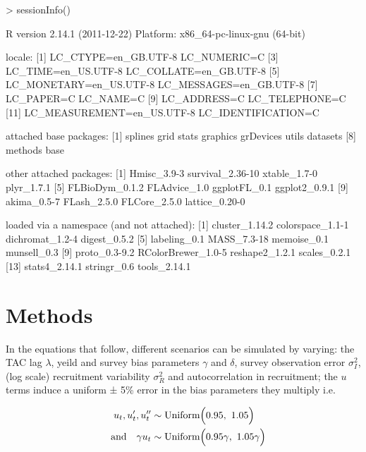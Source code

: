 \documentclass[a4paper]{article}
\begin{document}
\begin{Schunk}
\begin{Sinput}
> sessionInfo()
\end{Sinput}
\begin{Soutput}
R version 2.14.1 (2011-12-22)
Platform: x86_64-pc-linux-gnu (64-bit)

locale:
 [1] LC_CTYPE=en_GB.UTF-8       LC_NUMERIC=C              
 [3] LC_TIME=en_US.UTF-8        LC_COLLATE=en_GB.UTF-8    
 [5] LC_MONETARY=en_US.UTF-8    LC_MESSAGES=en_GB.UTF-8   
 [7] LC_PAPER=C                 LC_NAME=C                 
 [9] LC_ADDRESS=C               LC_TELEPHONE=C            
[11] LC_MEASUREMENT=en_US.UTF-8 LC_IDENTIFICATION=C       

attached base packages:
[1] splines   grid      stats     graphics  grDevices utils     datasets 
[8] methods   base     

other attached packages:
 [1] Hmisc_3.9-3      survival_2.36-10 xtable_1.7-0     plyr_1.7.1      
 [5] FLBioDym_0.1.2   FLAdvice_1.0     ggplotFL_0.1     ggplot2_0.9.1   
 [9] akima_0.5-7      FLash_2.5.0      FLCore_2.5.0     lattice_0.20-0  

loaded via a namespace (and not attached):
 [1] cluster_1.14.2     colorspace_1.1-1   dichromat_1.2-4    digest_0.5.2      
 [5] labeling_0.1       MASS_7.3-18        memoise_0.1        munsell_0.3       
 [9] proto_0.3-9.2      RColorBrewer_1.0-5 reshape2_1.2.1     scales_0.2.1      
[13] stats4_2.14.1      stringr_0.6        tools_2.14.1      
\end{Soutput}
\end{Schunk}

\pagebreak
\section{Methods}

In the equations that follow, different scenarios can be simulated by varying: the TAC lag $\lambda$, yeild and survey bias parameters $\gamma$ and $\delta$, survey observation error $\sigma_I^2$, (log scale) recruitment variability $\sigma_R^2$ and autocorrelation in recruitment; the $u$ terms induce a uniform ± 5\% error in the bias parameters they multiply i.e.

\begin{align*}
  u_t, u'_t, u''_t &\sim \text{Uniform} \Big( 0.95,\ 1.05 \Big) \\
  \quad \text{and} \quad \gamma u_t &\sim \text{Uniform} \Big( 0.95\gamma,\ 1.05\gamma \Big)
\end{align*}
\end{document}
